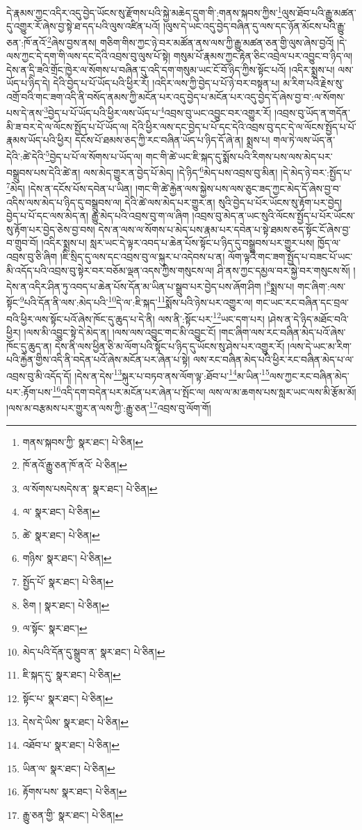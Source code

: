 དེ་རྣམས་ཀྱང་འདིར་འདུ་བྱེད་ཡོངས་སུ་རྫོགས་པའི་སྐྱེ་མཆེད་དྲུག་གི་:གནས་སྐབས་ཀྱིས་\footnote{གནས་སྐབས་ཀྱི་  སྣར་ཐང་།  པེ་ཅིན། }ལུས་ཐོབ་པའི་རྒྱུ་མཚན་དུ་འགྱུར་རོ་ཞེས་བྱ་སྟེ་ཐ་དད་པའི་ལུས་འཛིན་པའོ། །ལུས་དེ་ཡང་འདུ་བྱེད་བཞིན་དུ་ལས་དང་ཉོན་མོངས་པའི་རྒྱུ་ཅན་:ཁོ་ནའོ་\footnote{ཁོ་ནའོ་རྒྱུ་ཅན་ཁོ་ནའོ་  པེ་ཅིན། }ཞེས་བྱས་ནས། གཅིག་གིས་ཀྱང་ཉེ་བར་མཚོན་ནས་ལས་ཀྱི་རྒྱུ་མཚན་ཅན་གྱི་ལུས་ཞེས་བྱའོ། །དེ་ལས་ཀྱང་དེ་དག་གི་ལས་དང་དེའི་འབྲས་བུ་ལུས་པོ་སྟེ། གསུམ་པོ་རྣམས་ཀྱང་རྟེན་ཅིང་འབྲེལ་པར་འབྱུང་བ་ཉིད་ལ། དེས་ན་དྲི་ཟའི་གྲོང་ཁྱེར་ལ་སོགས་པ་བཞིན་དུ་འདི་དག་གསུམ་ཡང་ངོ་བོ་ཉིད་ཀྱིས་སྟོང་པའོ། །འདིར་སྨྲས་པ། ལས་ཡོད་པ་ཉིད་དེ། དེའི་བྱེད་པ་པོ་ཡོད་པའི་ཕྱིར་རོ། །འདིར་ལས་ཀྱི་བྱེད་པ་པོ་ཉེ་བར་བསྟན་པ། མ་རིག་པའི་རྗེས་སུ་འགྲོ་བའི་གང་ཟག་འདི་ནི་བསོད་ནམས་ཀྱི་མངོན་པར་འདུ་བྱེད་པ་མངོན་པར་འདུ་བྱེད་དོ་ཞེས་བྱ་བ་:ལ་སོགས་པས་དེ་ནས་\footnote{ལ་སོགས་པསདེས་ན་  སྣར་ཐང་།  པེ་ཅིན། }བྱེད་པ་པོ་ཡོད་པའི་ཕྱིར་ལས་ཡོད་པ་\footnote{ལ་  སྣར་ཐང་།  པེ་ཅིན། }འབྲས་བུ་ཡང་འབྱུང་བར་འགྱུར་རོ། །འབྲས་བུ་ཡོད་ན་གདོན་མི་ཟ་བར་དེ་ལ་ལོངས་སྤྱོད་པ་པོ་ཡོད་ལ། དེའི་ཕྱིར་ལས་དང་བྱེད་པ་པོ་དང་དེའི་འབྲས་བུ་དང་དེ་ལ་ལོངས་སྤྱོད་པ་པོ་རྣམས་ཡོད་པའི་ཕྱིར། དངོས་པོ་ཐམས་ཅད་ཀྱི་རང་བཞིན་ཡོད་པ་ཉིད་དོ་ཞེ་ན། སྨྲས་པ། གལ་ཏེ་ལས་ཡོད་ན་དེའི་:ཚེ་དེའི་\footnote{ཚེ་  སྣར་ཐང་།  པེ་ཅིན། }བྱེད་པ་པོ་ལ་སོགས་པ་ཡོད་ལ། གང་གི་ཚེ་ཡང་ཇི་སྐད་དུ་སྨོས་པའི་རིགས་པས་ལས་མེད་པར་བསྒྲུབས་པས་དེའི་ཚེ་ན། ལས་མེད་གྱུར་ན་བྱེད་པོ་མེད། །དེ་ཉིད་\footnote{གཉིས་  སྣར་ཐང་།  པེ་ཅིན། }མེད་པས་འབྲས་བུ་མིན། །དེ་མེད་ཉེ་བར་:སྤྱོད་པ་\footnote{སྤྱོད་པོ་  སྣར་ཐང་།  པེ་ཅིན། }མེད། །དེས་ན་དངོས་པོས་དབེན་པ་ཡིན། །གང་གི་ཚེ་རྐྱེན་ལས་སྐྱེས་པས་ལས་ཅུང་ཟད་ཀྱང་མེད་དོ་ཞེས་བྱ་བ་འདིས་ལས་མེད་པ་ཉིད་དུ་བསྒྲུབས་ལ། དེའི་ཚེ་ལས་མེད་པར་གྱུར་ན། སུའི་བྱེད་པ་པོར་ཡོངས་སུ་རྟོག་པར་བྱེད། བྱེད་པ་པོ་དང་ལས་མེད་ན། རྒྱུ་མེད་པའི་འབྲས་བུ་ག་ལ་ཞིག །འབྲས་བུ་མེད་ན་ཡང་སུའི་ལོངས་སྤྱོད་པ་པོར་ཡོངས་སུ་རྟོག་པར་བྱེད་ཅེས་བྱ་བས། དེས་ན་ལས་ལ་སོགས་པ་མེད་པས་རྣམ་པར་དབེན་པ་སྟེ་ཐམས་ཅད་སྟོང་ངོ་ཞེས་བྱ་བ་གྲུབ་བོ། །འདིར་སྨྲས་པ། སླར་ཡང་དེ་ལྟར་འབད་པ་ཆེན་པོས་སྟོང་པ་ཉིད་དུ་བསྒྲུབས་པར་གྱུར་པས། ཁྱོད་ལ་འབྲས་བུ་ཅི་ཞིག །ཇི་སྲིད་དུ་ལས་དང་འབྲས་བུ་ལ་སྐུར་པ་འདེབས་པ་ན། ལོག་ལྟའི་གང་ཟག་སྤྱོད་པ་བཟང་པོ་ཡང་མི་འདོད་པའི་འབྲས་བུ་སྟེར་བར་བཅོམ་ལྡན་འདས་ཀྱིས་གསུངས་ལ། ཤི་ནས་ཀྱང་དམྱལ་བར་སྐྱེ་བར་གསུངས་སོ། །དེས་ན་འདིར་ཤིན་ཏུ་འབད་པ་ཆེན་པོས་དོན་མ་ཡིན་པ་སྒྲུབ་པར་བྱེད་པས་ཞོག་ཤིག །\footnote{ཅིག །  སྣར་ཐང་།  པེ་ཅིན། }སྨྲས་པ། གང་ཞིག་:ལས་སྟོང་\footnote{ལ་སྟོང་  སྣར་ཐང་། }པའི་དོན་ནི་ལས་:མེད་པའི་\footnote{མེད་པའི་དོན་དུ་སྒྲུབ་ན་  སྣར་ཐང་།  པེ་ཅིན། }དེ་ལ་:ཇི་སྐད་\footnote{ཇི་སྐད་དུ་  སྣར་ཐང་།  པེ་ཅིན། }སྨོས་པའི་ཉེས་པར་འགྱུར་ལ། གང་ཡང་རང་བཞིན་དང་བྲལ་བའི་ཕྱིར་ལས་སྟོང་པའོ་ཞེས་ཁོང་དུ་ཆུད་པ་དེ་ནི། ལས་ནི་:སྟོང་པར་\footnote{སྟོང་པ་  སྣར་ཐང་།  པེ་ཅིན། }ཡང་དག་པར། །ཤེས་ན་དེ་ཉིད་མཐོང་བའི་ཕྱིར། །ལས་མི་འབྱུང་སྟེ་དེ་མེད་ན། །ལས་ལས་འབྱུང་གང་མི་འབྱུང་ངོ། །གང་ཞིག་ལས་རང་བཞིན་མེད་པའོ་ཞེས་ཁོང་དུ་ཆུད་ན། དེས་ནི་ལས་ཕྱིན་ཅི་མ་ལོག་པའི་སྟོང་པ་ཉིད་དུ་ཡོངས་སུ་ཤེས་པར་འགྱུར་རོ། །ལས་དེ་ཡང་མ་རིག་པའི་རྐྱེན་གྱིས་འདི་ནི་བདེན་པའོ་ཞེས་མངོན་པར་ཞེན་པ་སྟེ། ལས་རང་བཞིན་མེད་པའི་ཕྱིར་རང་བཞིན་མེད་པ་ལ་འབྲས་བུ་མི་འདོད་དོ། །དེས་ན་དེས་\footnote{དེས་དེ་ཡིས་  སྣར་ཐང་།  པེ་ཅིན། }སྐུར་པ་བཏབ་ནས་ལོག་ལྟ་:ཐོབ་པ་\footnote{འཐོབ་པ་  སྣར་ཐང་།  པེ་ཅིན། }མ་ཡིན་\footnote{ཡིན་ལ་  སྣར་ཐང་།  པེ་ཅིན། }ལས་ཀྱང་རང་བཞིན་མེད་པར་:རྟོག་པས་\footnote{རྟོགས་པས་  སྣར་ཐང་།  པེ་ཅིན། }འདི་དག་བདེན་པར་མངོན་པར་ཞེན་པ་སྤོང་ལ། ལས་ལ་མ་ཆགས་པས་སླར་ཡང་ལས་མི་རྩོམ་མོ། །ལས་མ་བརྩམས་པར་གྱུར་ན་ལས་ཀྱི་:རྒྱུ་ཅན་\footnote{རྒྱུ་ཅན་གྱི་  སྣར་ཐང་།  པེ་ཅིན། }འབྲས་བུ་ལོག་གོ། 